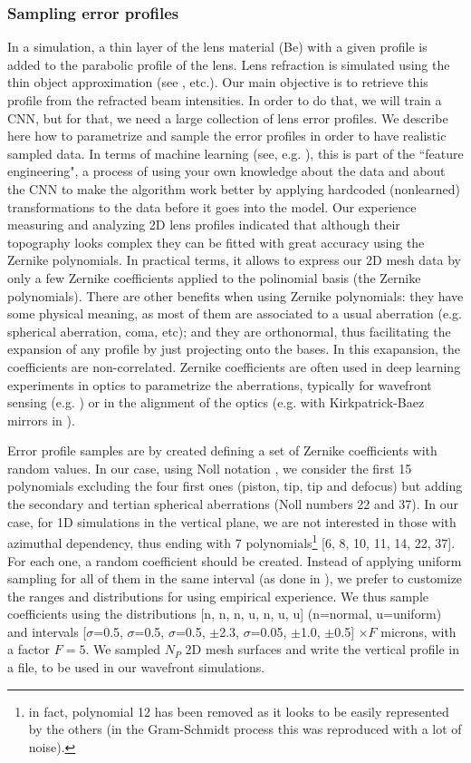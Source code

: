 \documentclass{iucr}
\begin{document}
\subsubsection{Sampling error profiles}
In a simulation, a thin layer of the lens material (Be) with a given profile is added to the parabolic profile of the lens. Lens refraction is simulated using the thin object approximation (see \cite{multioptics}, etc.). Our main objective is to retrieve this profile from the refracted beam intensities. In order to do that, we will train a CNN, but for that, we need a large collection of lens error profiles. We describe here how to parametrize and sample the error profiles in order to have realistic sampled data. In terms of machine learning (see, e.g. \cite{chollet_book}), this is part of the ``feature engineering", a process of using your own knowledge about the data and about the CNN to make the algorithm work better by applying hardcoded (nonlearned) transformations to the data before it goes into the model.
Our experience measuring and analyzing 2D lens profiles indicated that although their topography looks complex they can be fitted with great accuracy using the Zernike polynomials. In practical terms, it allows to express our 2D mesh data by only a few Zernike coefficients applied to the polinomial basis (the Zernike polynomials). There are other benefits when using Zernike polynomials: they have some physical meaning, as most of them are associated to a usual aberration (e.g. spherical aberration, coma, etc); and they are orthonormal, thus facilitating the expansion of any profile by just projecting onto the bases. In this exapansion, the coefficients are non-correlated. Zernike coefficients are often used in deep learning experiments in optics to parametrize the aberrations, typically for wavefront sensing (e.g. \cite{Saha2020}) or in the alignment of the optics (e.g. with Kirkpatrick-Baez mirrors in \cite{Luiz2022}). 

Error profile samples are by created defining a set of Zernike coefficients with random values. In our case, using Noll notation \cite{Noll:76}, we consider the first 15 polynomials excluding the four first ones (piston, tip, tip and defocus) but adding the secondary and tertian spherical aberrations (Noll numbers 22 and 37). In our case, for 1D simulations in the vertical plane, we are not interested in those with azimuthal dependency, thus ending with 7 polynomials\footnote{in fact, polynomial 12 has been removed as it looks to be easily represented by the others (in the Gram-Schmidt process this was reproduced with a lot of noise). } [6, 8, 10, 11, 14, 22, 37]. For each one, a random coefficient should be created. Instead of applying uniform sampling for all of them in the same interval (as done in \cite{Saha2020}), we prefer to customize the ranges and distributions for using empirical experience. We thus sample coefficients using the distributions [n, n, n, u, n, u, u]  (n=normal, u=uniform) and intervals [$\sigma$=0.5, $\sigma$=0.5, $\sigma$=0.5, $\pm$2.3, $\sigma$=0.05, $\pm$1.0, $\pm$0.5] $\times F$ microns, with a factor $F=5$. We sampled $N_P$ 2D mesh surfaces and write the vertical profile in a file, to be used in our wavefront simulations.
\end{document}
